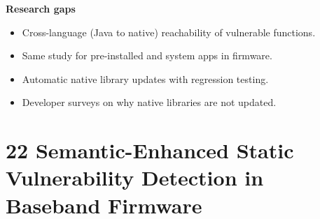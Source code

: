 \documentclass[11pt,a4paper]{article}
\begin{document}
\begin{enumerate}
    \vspace{4pt}
    \textbf{Research gaps}
    \begin{itemize}
        \item Cross-language (Java to native) reachability of vulnerable functions.
        \item Same study for pre-installed and system apps in firmware.
        \item Automatic native library updates with regression testing.
        \item Developer surveys on why native libraries are not updated.
    \end{itemize}

\end{enumerate}

\newpage

\section{22 Semantic-Enhanced Static Vulnerability Detection in Baseband Firmware}
\end{document}
